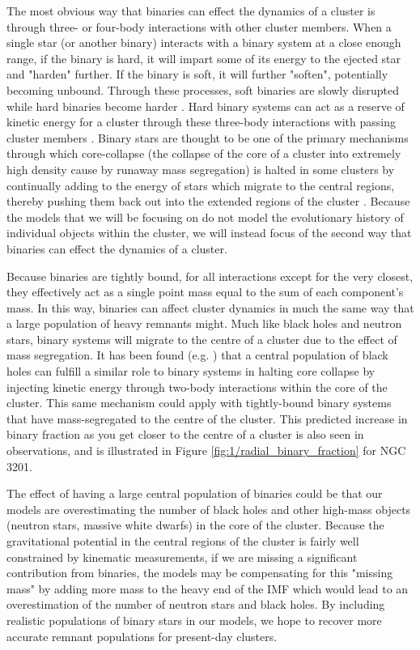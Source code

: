 The most obvious way that binaries can effect the dynamics of a cluster is through three- or
four-body interactions with other cluster members. When a single star (or another binary) interacts
with a binary system at a close enough range, if the binary is hard, it will impart some of its
energy to the ejected star and "harden" further. If the binary is soft, it will further "soften",
potentially becoming unbound. Through these processes, soft binaries are slowly disrupted while hard
binaries become harder \citep{Heggie1975}. Hard binary systems can act as a reserve of kinetic
energy for a cluster through these three-body interactions with passing cluster members
\citep{Heggie2003}. Binary stars are thought to be one of the primary mechanisms through which
core-collapse (the collapse of the core of a cluster into extremely high density cause by runaway
mass segregation) is halted in some clusters by continually adding to the energy of stars which
migrate to the central regions, thereby pushing them back out into the extended regions of the
cluster \citep{Chatterjee2013}. Because the models that we will be focusing on do not model the
evolutionary history of individual objects within the cluster, we will instead focus of the second
way that binaries can effect the dynamics of a cluster.

Because binaries are tightly bound, for all interactions except for the very closest, they
effectively act as a single point mass equal to the sum of each component's mass. In this way,
binaries can affect cluster dynamics in much the same way that a large population of heavy remnants
might. Much like black holes and neutron stars, binary systems will migrate to the centre of a
cluster due to the effect of mass segregation. It has been found (e.g. \citealt{Kremer2019}) that a
central population of black holes can fulfill a similar role to binary systems in halting core
collapse by injecting kinetic energy through two-body interactions within the core of the cluster.
This same mechanism could apply with tightly-bound binary systems that have mass-segregated to the
centre of the cluster. This predicted increase in binary fraction as you get closer to the centre of
a cluster is also seen in observations, and is illustrated in Figure
\ref{fig:1/radial_binary_fraction} for NGC 3201.

The effect of having a large central population of binaries could be that our models are
overestimating the number of black holes and other high-mass objects (neutron stars, massive white
dwarfs) in the core of the cluster. Because the gravitational potential in the central regions of
the cluster is fairly well constrained by kinematic measurements, if we are missing a significant
contribution from binaries, the models may be compensating for this "missing mass" by adding more
mass to the heavy end of the IMF which would lead to an overestimation of the number of neutron
stars and black holes. By including realistic populations of binary stars in our models, we hope to
recover more accurate remnant populations for present-day clusters.




